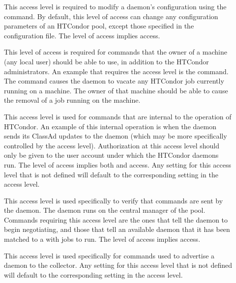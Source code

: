 \begin{description}
\item[] \label{sec-level-config} This access level is
   required to modify a daemon's configuration using
   the  command.
   By default, this level of access can
   change any configuration parameters of an HTCondor pool,
   except those specified in
   the  configuration file.
   The  level of access implies  access. 

\item[] \label{sec-level-owner} This level of access is
   required for commands that the owner of a machine (any local user)
   should be able to use, in addition to the HTCondor administrators.
   An example that requires the  access level is
   the  command.
   The command causes the  daemon to vacate any
   HTCondor job currently running on a machine.
   The owner of that machine should be able to cause the removal
   of a job running on the machine.

\item[] \label{sec-level-daemon} This access level
   is used for commands that are internal to the operation of
   HTCondor.  An example of this internal operation is when the
    daemon sends
   its ClassAd updates to the  daemon (which may be
   more specifically controlled by the 
   access level).
   Authorization at this access level should only be given to
   the user account under which the HTCondor daemons run.
   The  level of access implies both
    and  access.  Any setting for this access
   level that is not defined will default to the corresponding setting
   in the  access level.

\item[] \label{sec-level-negotiator} This 
   access level is used specifically to verify that commands are
   sent by the  daemon.
   The  daemon runs on the central manager of
   the pool.
   Commands requiring this access
   level are the ones that tell the  daemon to begin
   negotiating, and those that tell an available  daemon
   that it has been matched to a  with jobs to run.
   The  level of access implies  access. 

\item[] \label{sec-level-advertise-master} This
   access level is used specifically for commands used to advertise a
    daemon to the collector.  Any setting for this access
   level that is not defined will default to the corresponding setting
   in the  access level.


\end{description}
